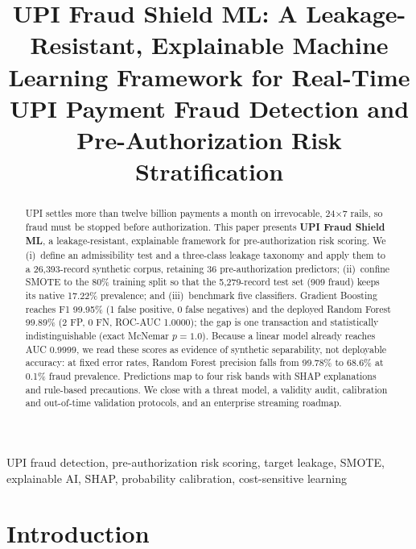 \documentclass[conference]{IEEEtran}
\begin{document}
\title{UPI Fraud Shield ML: A Leakage-Resistant, Explainable Machine Learning Framework for Real-Time UPI Payment Fraud Detection and Pre-Authorization Risk Stratification}

\author{
}

\maketitle

\begin{abstract}
UPI settles more than twelve billion payments a month on irrevocable, 24$\times$7 rails, so fraud must be stopped before authorization. This paper presents \textbf{UPI Fraud Shield ML}, a leakage-resistant, explainable framework for pre-authorization risk scoring. We (i)~define an admissibility test and a three-class leakage taxonomy and apply them to a 26,393-record synthetic corpus, retaining 36 pre-authorization predictors; (ii)~confine SMOTE to the 80\% training split so that the 5,279-record test set (909 fraud) keeps its native 17.22\% prevalence; and (iii)~benchmark five classifiers. Gradient Boosting reaches F1 99.95\% (1 false positive, 0 false negatives) and the deployed Random Forest 99.89\% (2 FP, 0 FN, ROC-AUC 1.0000); the gap is one transaction and statistically indistinguishable (exact McNemar $p=1.0$). Because a linear model already reaches AUC 0.9999, we read these scores as evidence of synthetic separability, not deployable accuracy: at fixed error rates, Random Forest precision falls from 99.78\% to 68.6\% at 0.1\% fraud prevalence. Predictions map to four risk bands with SHAP explanations and rule-based precautions. We close with a threat model, a validity audit, calibration and out-of-time validation protocols, and an enterprise streaming roadmap.
\end{abstract}

\begin{IEEEkeywords}
UPI fraud detection, pre-authorization risk scoring, target leakage, SMOTE, explainable AI, SHAP, probability calibration, cost-sensitive learning
\end{IEEEkeywords}

\section{Introduction}
\end{document}
